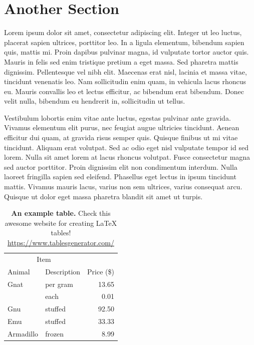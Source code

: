 \section{Another Section}
Lorem ipsum dolor sit amet, consectetur adipiscing elit. Integer ut leo luctus, placerat sapien ultrices, porttitor leo. In a ligula elementum, bibendum sapien quis, mattis mi. Proin dapibus pulvinar magna, id vulputate tortor auctor quis. Mauris in felis sed enim tristique pretium a eget massa. Sed pharetra mattis dignissim. Pellentesque vel nibh elit. Maecenas erat nisl, lacinia et massa vitae, tincidunt venenatis leo. Nam sollicitudin enim quam, in vehicula lacus rhoncus eu. Mauris convallis leo et lectus efficitur, ac bibendum erat bibendum. Donec velit nulla, bibendum eu hendrerit in, sollicitudin ut tellus.

Vestibulum lobortis enim vitae ante luctus, egestas pulvinar ante gravida. Vivamus elementum elit purus, nec feugiat augue ultricies tincidunt. Aenean efficitur dui quam, at gravida risus semper quis. Quisque finibus ut mi vitae tincidunt. Aliquam erat volutpat. Sed ac odio eget nisl vulputate tempor id sed lorem. Nulla sit amet lorem at lacus rhoncus volutpat. Fusce consectetur magna sed auctor porttitor. Proin dignissim elit non condimentum interdum. Nulla laoreet fringilla sapien sed eleifend. Phasellus eget lectus in ipsum tincidunt mattis. Vivamus mauris lacus, varius non sem ultrices, varius consequat arcu. Quisque ut dolor eget massa pharetra blandit sit amet ut turpis.

\begin{table}[t]
\centering
\begin{tabular}{llr}
\hline
\multicolumn{2}{c}{Item} &           \\ \cline{1-2}
Animal     & Description & Price (\$) \\ \hline
Gnat       & per gram    & 13.65     \\
           & each        & 0.01      \\
Gnu        & stuffed     & 92.50     \\
Emu        & stuffed     & 33.33     \\
Armadillo  & frozen      & 8.99      \\ \hline
\end{tabular}
\caption[An example table.]{\textbf{An example table.} Check this awesome website for creating \LaTeX{} tables! \href{https://www.tablesgenerator.com/}{https://www.tablesgenerator.com/}}
\label{tab:my-table}
\end{table}


